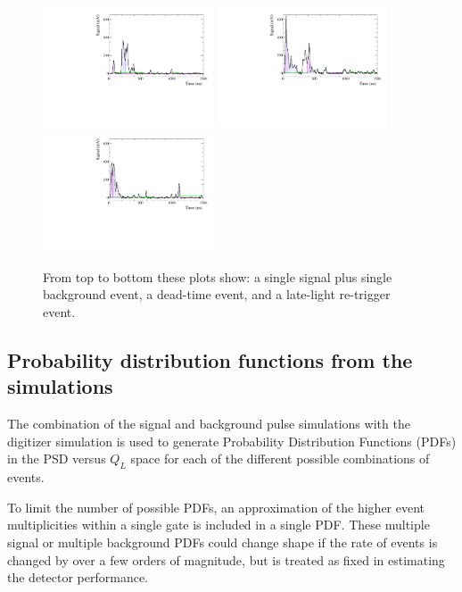 \documentclass[twocolumn]{bmcart}
\begin{document}
\begin{figure}[!htpb]
\centering
\includegraphics[width=0.45\textwidth]{figures/mixed1.pdf}
\includegraphics[width=0.45\textwidth]{figures/deadevent1.pdf}
\includegraphics[width=0.45\textwidth]{figures/latelight1.pdf}
\caption{ From top to bottom these plots show: a single signal plus
  single background event, a dead-time event, and a late-light
  re-trigger event. }\label{fig:eventTypes2}
\end{figure}



\subsection{ Probability distribution functions from the simulations }

The combination of the signal and background pulse simulations with
the digitizer simulation is used to generate Probability Distribution
Functions (PDFs) in the PSD versus $Q_L$ space for each of the
different possible combinations of events.

To limit the number of possible PDFs, an approximation of the higher
event multiplicities within a single gate is included in a single PDF.
These multiple signal or multiple background PDFs could change shape
if the rate of events is changed by over a few orders of magnitude,
but is treated as fixed in estimating the detector performance.
\end{document}
